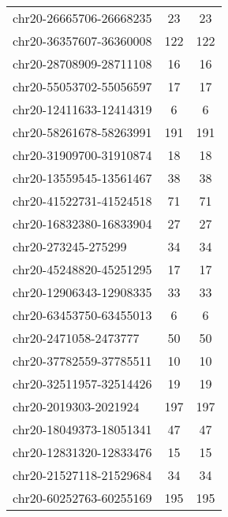 \begin{longtable}{lSS}
	chr20-26665706-26668235 & 23     & 23                                        \\
	chr20-36357607-36360008 & 122    & 122                                       \\
	chr20-28708909-28711108 & 16     & 16                                        \\
	chr20-55053702-55056597 & 17     & 17                                        \\
	chr20-12411633-12414319 & 6      & 6                                         \\
	chr20-58261678-58263991 & 191    & 191                                       \\
	chr20-31909700-31910874 & 18     & 18                                        \\
	chr20-13559545-13561467 & 38     & 38                                        \\
	chr20-41522731-41524518 & 71     & 71                                        \\
	chr20-16832380-16833904 & 27     & 27                                        \\
	chr20-273245-275299     & 34     & 34                                        \\
	chr20-45248820-45251295 & 17     & 17                                        \\
	chr20-12906343-12908335 & 33     & 33                                        \\
	chr20-63453750-63455013 & 6      & 6                                         \\
	chr20-2471058-2473777   & 50     & 50                                        \\
	chr20-37782559-37785511 & 10     & 10                                        \\
	chr20-32511957-32514426 & 19     & 19                                        \\
	chr20-2019303-2021924   & 197    & 197                                       \\
	chr20-18049373-18051341 & 47     & 47                                        \\
	chr20-12831320-12833476 & 15     & 15                                        \\
	chr20-21527118-21529684 & 34     & 34                                        \\
	chr20-60252763-60255169 & 195    & 195                                       \\

\end{longtable}
